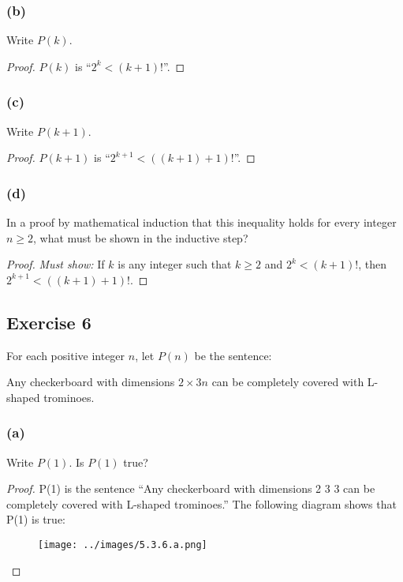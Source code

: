 \documentclass[14pt]{extarticle}
\begin{document}
\subsubsection{(b)}
Write $P(k)$.

\begin{proof}
    $P(k)$ is ``$2^k < (k + 1)!$''.
\end{proof}

\subsubsection{(c)}
Write $P(k + 1)$.

\begin{proof}
    $P(k + 1)$ is ``$2^{k + 1} < ((k + 1) + 1)!$''.
\end{proof}

\subsubsection{(d)}
In a proof by mathematical induction that this inequality holds for every integer $n \geq 2$, what must be shown in the inductive step?

\begin{proof}
    {\it Must show:} If $k$ is any integer such that $k \geq 2$ and $2^k < (k + 1)!$, then $2^{k + 1} < ((k + 1) + 1)!$.
\end{proof}

\subsection{Exercise 6}
For each positive integer $n$, let $P(n)$ be the sentence:

Any checkerboard with dimensions $2 \times 3n$ can be completely covered with L-shaped trominoes.

\subsubsection{(a)}
Write $P(1)$. Is $P(1)$ true?

\begin{proof}
    P(1) is the sentence “Any checkerboard with
    dimensions 2 3 3 can be completely covered with
    L-shaped trominoes.” The following diagram shows
    that P(1) is true:
    \begin{figure}[ht!]
        \centering
        \texttt{[image: ../images/5.3.6.a.png]}
    \end{figure}
\end{proof}
\end{document}
